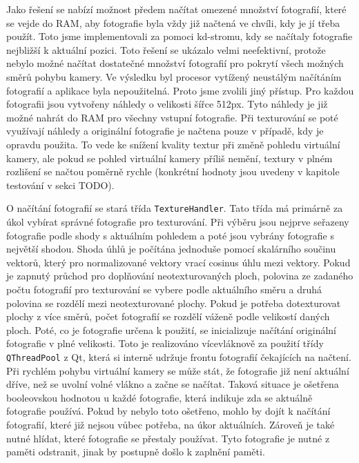 \documentclass[11pt,twoside,a4paper]{book}
\begin{document}
Jako řešení se nabízí možnost předem načítat omezené množství fotografií, které se vejde do RAM, aby fotografie byla vždy již načtená ve chvíli, kdy je jí třeba použít. Toto jsme implementovali za pomoci kd-stromu, kdy se načítaly fotografie nejbližší k aktuální pozici. Toto řešení se ukázalo velmi neefektivní, protože nebylo možné načítat dostatečné množství fotografií pro pokrytí všech možných směrů pohybu kamery. Ve výsledku byl procesor vytížený neustálým načítáním fotografií a aplikace byla nepoužitelná. Proto jsme zvolili jiný přístup. Pro každou fotografii jsou vytvořeny náhledy o velikosti šířce 512px. Tyto náhledy je již možné nahrát do RAM pro všechny vstupní fotografie. Při texturování se poté využívají náhledy a originální fotografie je načtena pouze v případě, kdy je opravdu použita. To vede ke snížení kvality textur při změně pohledu virtuální kamery, ale pokud se pohled virtuální kamery příliš nemění, textury v plném rozlišení se načtou poměrně rychle (konkrétní hodnoty jsou uvedeny v kapitole testování v sekci TODO).

O načítání fotografií se stará třída \texttt{TextureHandler}. Tato třída má primárně za úkol vybírat správné fotografie pro texturování. Při výběru jsou nejprve seřazeny fotografie podle shody s aktuálním pohledem a poté jsou vybrány fotografie s největší shodou. Shoda úhlů je počítána jednoduše pomocí skalárního součinu vektorů, který pro normalizované vektory vrací cosinus úhlu mezi vektory. Pokud je zapnutý průchod pro doplňování neotexturovaných ploch, polovina ze zadaného počtu fotografií pro texturování se vybere podle aktuálního směru a druhá polovina se rozdělí mezi neotexturované plochy. Pokud je potřeba dotexturovat plochy z více směrů, počet fotografií se rozdělí váženě podle velikostí daných ploch. Poté, co je fotografie určena k použití, se inicializuje načítání originální fotografie v plné velikosti. Toto je realizováno vícevláknově za použití třídy \texttt{QThreadPool} z Qt, která si interně udržuje frontu fotografií čekajících na načtení.  Při rychlém pohybu virtuální kamery se může stát, že fotografie již není aktuální dříve, než se uvolní volné vlákno a začne se načítat. Taková situace je ošetřena booleovskou hodnotou u každé fotografie, která indikuje zda se aktuálně fotografie používá. Pokud by nebylo toto ošetřeno, mohlo by dojít k načítání fotografií, které již nejsou vůbec potřeba, na úkor aktuálních. Zároveň je také nutné hlídat, které fotografie se přestaly používat. Tyto fotografie je nutné z paměti odstranit, jinak by postupně došlo k zaplnění paměti.
\end{document}
